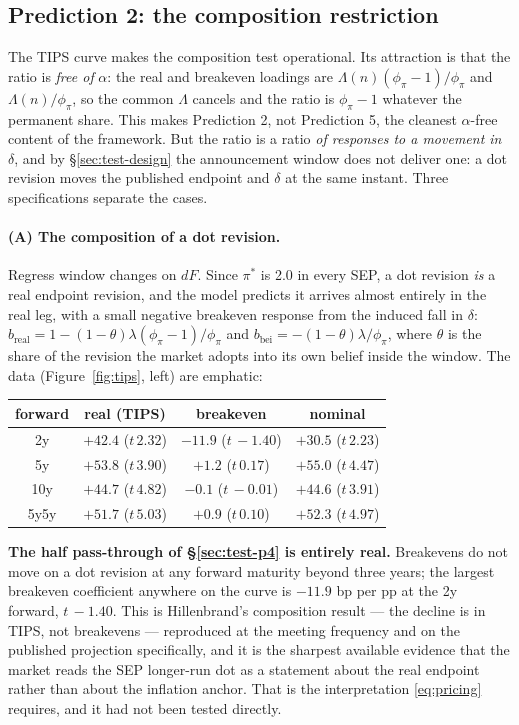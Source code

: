 \documentclass[11pt]{article}
\begin{document}
\subsection{Prediction 2: the composition restriction}
\label{sec:test-p2}
The TIPS curve makes the composition test operational. Its attraction is that
the ratio is \emph{free of} $\alpha$: the real and breakeven loadings are
$\Lambda(n)(\phi_\pi-1)/\phi_\pi$ and $\Lambda(n)/\phi_\pi$, so the common
$\Lambda$ cancels and the ratio is $\phi_\pi-1$ whatever the permanent share.
This makes Prediction 2, not Prediction 5, the cleanest $\alpha$-free content
of the framework. But the ratio is a ratio \emph{of responses to a movement in
$\delta$}, and by \S\ref{sec:test-design} the announcement window does not
deliver one: a dot revision moves the published endpoint and $\delta$ at the
same instant. Three specifications separate the cases.
\paragraph{(A) The composition of a dot revision.} Regress window changes on
$dF$. Since $\pi^{*}$ is 2.0 in every SEP, a dot revision \emph{is} a real
endpoint revision, and the model predicts it arrives almost entirely in the
real leg, with a small negative breakeven response from the induced fall in
$\delta$: $b_{\text{real}} = 1 - (1-\theta)\lambda(\phi_\pi-1)/\phi_\pi$ and
$b_{\text{bei}} = -(1-\theta)\lambda/\phi_\pi$, where $\theta$ is the share of
the revision the market adopts into its own belief inside the window. The data
(Figure~\ref{fig:tips}, left) are emphatic:
\begin{center}\small
\begin{tabular}{cccc}
\toprule
forward & real (TIPS) & breakeven & nominal\\
\midrule
2y & $+42.4$ ($t\,2.32$) & $-11.9$ ($t\,{-}1.40$) & $+30.5$ ($t\,2.23$)\\
5y & $+53.8$ ($t\,3.90$) & $+1.2$ ($t\,0.17$) & $+55.0$ ($t\,4.47$)\\
10y & $+44.7$ ($t\,4.82$) & $-0.1$ ($t\,{-}0.01$) & $+44.6$ ($t\,3.91$)\\
5y5y & $+51.7$ ($t\,5.03$) & $+0.9$ ($t\,0.10$) & $+52.3$ ($t\,4.97$)\\
\bottomrule
\end{tabular}
\end{center}
\noindent \textbf{The half pass-through of \S\ref{sec:test-p4} is entirely
real.} Breakevens do not move on a dot revision at any forward maturity beyond
three years; the largest breakeven coefficient anywhere on the curve is
$-11.9$ bp per pp at the 2y forward, $t\,{-}1.40$. This is Hillenbrand's
composition result --- the decline is in TIPS, not breakevens --- reproduced at
the meeting frequency and on the published projection specifically, and it is
the sharpest available evidence that the market reads the SEP longer-run dot as
a statement about the real endpoint rather than about the inflation anchor.
That is the interpretation \eqref{eq:pricing} requires, and it had not been
tested directly.
\end{document}
